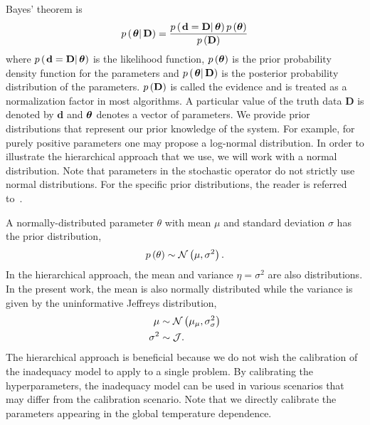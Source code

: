 \documentclass[fontsize=12pt, %
               paper=a4, %
               hyperref]{report}
\begin{document}
  Bayes' theorem is 
  \begin{align}
    p\left(\left.\boldsymbol{\theta}\right| \mathbf{D}\right) = 
    \frac{p\left(\left.\mathbf{d} = \mathbf{D}\right|\boldsymbol{\theta}\right)p\left(\boldsymbol{\theta}\right)}{p\left(\mathbf{D}\right)}
    \label{eq:bayes}
  \end{align}
  where $p\left(\left.\mathbf{d} = \mathbf{D}\right|\boldsymbol{\theta}\right)$ is the likelihood function, 
  $p\left(\boldsymbol{\theta}\right)$ is the prior probability density function for the parameters and 
  $p\left(\left.\boldsymbol{\theta}\right| \mathbf{D}\right)$ is the posterior probability distribution of 
  the parameters.  $p\left(\mathbf{D}\right)$ is called the evidence and is treated as a 
  normalization factor in most algorithms.  A particular value of the truth data $\mathbf{D}$ 
  is denoted by $\mathbf{d}$ and $\boldsymbol{\theta}$ denotes a vector of parameters.  We provide 
  prior distributions that represent our prior knowledge of the system.  For example, 
  for purely positive parameters one may propose a log-normal distribution.  In order to 
  illustrate the hierarchical approach that we use, we will work with a normal distribution.  
  Note that parameters in the stochastic operator do not strictly use normal distributions.  
  For the specific prior distributions, the reader is referred to~\cite{morrison2016representing}.  
  
  A normally-distributed parameter $\theta$ with mean $\mu$ and standard deviation $\sigma$ 
  has the prior distribution,
  \begin{align}
    p\left(\theta\right) \sim \mathcal{N}\left(\mu, \sigma^{2}\right). \label{eq:normal_prior}
  \end{align}
  In the hierarchical approach, the mean and variance $\eta = \sigma^{2}$ are also 
  distributions.  In the present work, the mean is also normally distributed while 
  the variance is given by the uninformative Jeffreys distribution, 
  \begin{subequations}
    \begin{align}
      \mu        &\sim \mathcal{N}\left(\mu_{\mu}, \sigma^{2}_{\sigma}\right) \\
      \sigma^{2} &\sim \mathcal{J}.
    \end{align}
  \end{subequations}
  The hierarchical approach is beneficial because we do not wish the calibration of the 
  inadequacy model to apply to a single problem.  By calibrating the hyperparameters, 
  the inadequacy model can be used in various scenarios that may differ from the 
  calibration scenario.  Note that we directly calibrate the parameters appearing 
  in the global temperature dependence.
  
\end{document}

